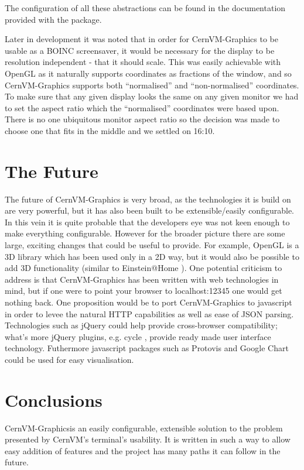 \documentclass[twocolumn,aps]{revtex4}
\makeatletter
\newcommand{\cernvm}{CernVM}
\newcommand{\cernvmgraphics}{\cernvm{}-Graphics}
\newcommand{\boinc}{BOINC}
\newcommand{\opengl}{OpenGL}
\newcommand{\json}{JSON}
\newcommand{\vmport}{12345}
\newcommand{\einsteinathome}{Einstein@Home}
\newcommand{\jquery}{jQuery}
\newcommand{\protovis}{Protovis}
\newcommand{\googlechart}{Google Chart}
\makeatother
\begin{document}
    The configuration of all these abstractions can be found in the
    documentation provided with the package.
    
    Later in development it was noted that in order for \cernvmgraphics{} to
    be usable as a \boinc{} screensaver, it would be necessary for the
    display to be resolution independent - that it should scale. This was
    easily achievable with \opengl{} as it naturally supports coordinates as
    fractions of the window, and so \cernvmgraphics{} supports both
    ``normalised'' and ``non-normalised'' coordinates. To make sure that any
    given display looks the same on any given monitor we had to set the
    aspect ratio which the ``normalised'' coordinates were based upon.
    There is no one ubiquitous monitor aspect ratio so the decision was made
    to choose one that fits in the middle and we settled on 16:10.

  \section{ The Future }
    The future of \cernvmgraphics{} is very broad, as the technologies it is
    build on are very powerful, but it has also been built to be 
    extensible/easily configurable. In this vein it is quite probable that
    the developers eye was not keen enough to make everything configurable.
    However for the broader picture there are some large, exciting changes
    that could be useful to provide. For example, \opengl{} is a 3D library
    which has been used only in a 2D way, but it would also be possible to
    add 3D functionality (similar to \einsteinathome{} \cite{einsteinathome}
    ). One potential criticism to address is that \cernvmgraphics{} has been
    written with web technologies in mind, but if one were to point your
    browser to localhost:\vmport{} one would get nothing back. One
    proposition would be to port \cernvmgraphics{} to javascript in order to
    levee the natural HTTP capabilities as well as ease of \json{} parsing.
    Technologies such as \jquery{} \cite{jquery} could help provide 
    cross-browser compatibility; what's more \jquery{} plugins, e.g. cycle
    \cite{jquery-cycle}, provide ready made user interface technology.
    Futhermore javascript packages such as \protovis{} \cite{protovis} and
    \googlechart{} \cite{gchart} could be used for easy visualisation.

  \section{ Conclusions }
    \cernvmgraphics is an easily configurable, extensible solution to the
    problem presented by \cernvm{}'s terminal's usability. It is written in
    such a way to allow easy addition of features and the project has many 
    paths it can follow in the future.
\end{document}
